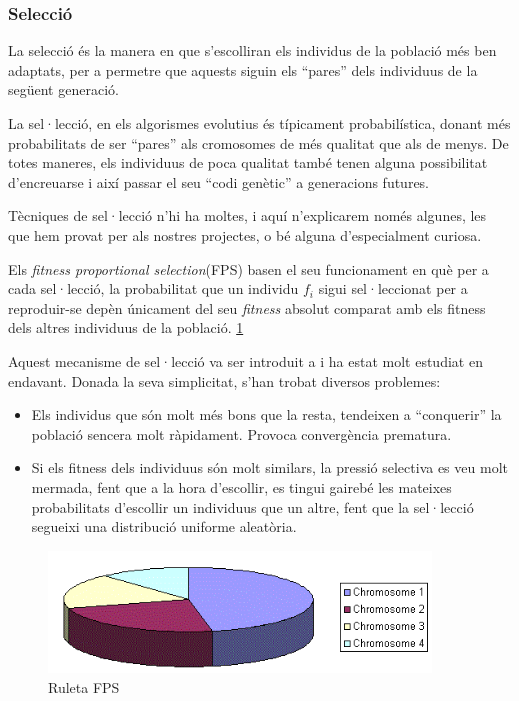 \subsubsection{Selecció}
La selecció és la manera en que s'escolliran els individus de la població més
ben adaptats, per a permetre que aquests siguin els ``pares'' dels individuus de
la següent generació.

La sel·lecció, en els algorismes evolutius és típicament probabilística, donant
més probabilitats de ser ``pares'' als cromosomes de més qualitat que als de
menys.  De totes maneres, els individuus de poca qualitat també tenen alguna
possibilitat d'encreuarse i així passar el seu ``codi genètic'' a generacions
futures.

Tècniques de sel·lecció n'hi ha moltes, i aquí n'explicarem només algunes, les
que hem provat per als nostres projectes, o bé alguna d'especialment curiosa.

Els \emph{fitness proportional selection}(FPS) basen el seu funcionament en què
per a cada sel·lecció, la probabilitat que un individu $f_i$ sigui sel·leccionat
per a reproduir-se depèn únicament del seu \emph{fitness} absolut comparat amb
els fitness dels altres individuus de la població. \ref{fig:rwsgraph} 

Aquest mecanisme de sel·lecció va ser introduit a \cite{H75} i ha estat molt
estudiat en endavant.  Donada la seva simplicitat, s'han trobat diversos
problemes:

\begin{itemize}
	\item Els individus que són molt més bons que la resta, tendeixen a
	``conquerir'' la població sencera molt ràpidament. Provoca convergència
	prematura.
	\item Si els fitness dels individuus són molt similars, la pressió selectiva
	es veu molt mermada, fent que a la hora d'escollir, es tingui gairebé les
	mateixes probabilitats d'escollir un individuus que un altre, fent que la
	sel·lecció segueixi una distribució uniforme aleatòria.
\end{itemize}


\begin{figure} \centering \includegraphics[width=4in]{intro/rwsgraph.png}
\caption{\label{fig:rwsgraph}Ruleta FPS}
\end{figure}

